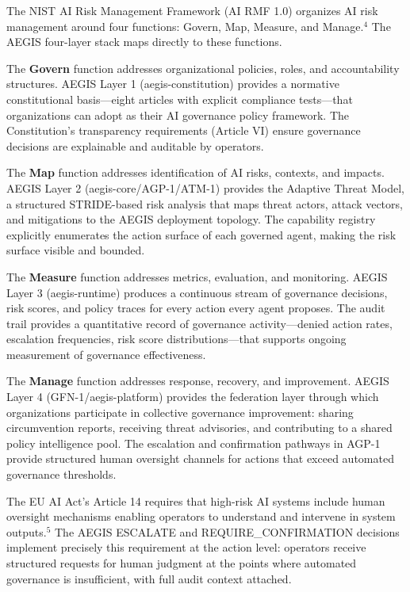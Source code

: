 \documentclass{IEEEcsmag}
\begin{document}
The NIST AI Risk Management Framework (AI RMF 1.0) organizes AI risk management around four functions: Govern, Map, Measure, and Manage.$^{4}$ The AEGIS four-layer stack maps directly to these functions.

The {\bf Govern} function addresses organizational policies, roles, and accountability structures. AEGIS Layer 1 (aegis-constitution) provides a normative constitutional basis---eight articles with explicit compliance tests---that organizations can adopt as their AI governance policy framework. The Constitution's transparency requirements (Article VI) ensure governance decisions are explainable and auditable by operators.

The {\bf Map} function addresses identification of AI risks, contexts, and impacts. AEGIS Layer 2 (aegis-core/AGP-1/ATM-1) provides the Adaptive Threat Model, a structured STRIDE-based risk analysis that maps threat actors, attack vectors, and mitigations to the AEGIS deployment topology. The capability registry explicitly enumerates the action surface of each governed agent, making the risk surface visible and bounded.

The {\bf Measure} function addresses metrics, evaluation, and monitoring. AEGIS Layer 3 (aegis-runtime) produces a continuous stream of governance decisions, risk scores, and policy traces for every action every agent proposes. The audit trail provides a quantitative record of governance activity---denied action rates, escalation frequencies, risk score distributions---that supports ongoing measurement of governance effectiveness.

The {\bf Manage} function addresses response, recovery, and improvement. AEGIS Layer 4 (GFN-1/aegis-platform) provides the federation layer through which organizations participate in collective governance improvement: sharing circumvention reports, receiving threat advisories, and contributing to a shared policy intelligence pool. The escalation and confirmation pathways in AGP-1 provide structured human oversight channels for actions that exceed automated governance thresholds.

The EU AI Act's Article 14 requires that high-risk AI systems include human oversight mechanisms enabling operators to understand and intervene in system outputs.$^{5}$ The AEGIS ESCALATE and REQUIRE\_CONFIRMATION decisions implement precisely this requirement at the action level: operators receive structured requests for human judgment at the points where automated governance is insufficient, with full audit context attached.
\end{document}
